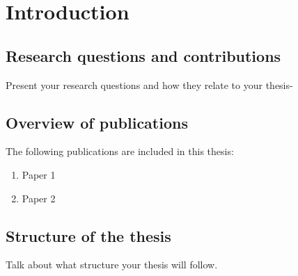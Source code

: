 \chapter{Introduction}
\label{chapter:introduction}

\section{Research questions and contributions}

Present your research questions and how they relate to your thesis-


\section{Overview of publications}

The following publications are included in this thesis:
\begin{enumerate}
    \item Paper 1
    \item Paper 2
\end{enumerate}


\section{Structure of the thesis}

Talk about what structure your thesis will follow.